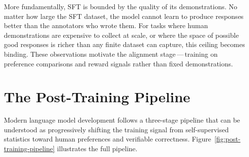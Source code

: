 More fundamentally, SFT is bounded by the quality of its demonstrations. No matter how large the SFT dataset, the model cannot learn to produce responses better than the annotators who wrote them. For tasks where human demonstrations are expensive to collect at scale, or where the space of possible good responses is richer than any finite dataset can capture, this ceiling becomes binding. These observations motivate the alignment stage\,---\,training on preference comparisons and reward signals rather than fixed demonstrations.

\section{The Post-Training Pipeline}
\label{sec:post-training-pipeline}

Modern language model development follows a three-stage pipeline that can be understood as progressively shifting the training signal from self-supervised statistics toward human preferences and verifiable correctness. Figure~\ref{fig:post-training-pipeline} illustrates the full pipeline.


